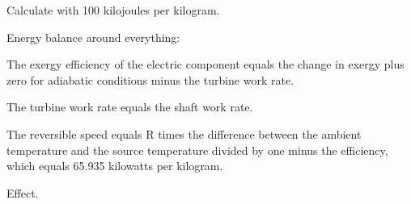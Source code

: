 Calculate with 100 kilojoules per kilogram.

Energy balance around everything:

The exergy efficiency of the electric component equals the change in exergy plus zero for adiabatic conditions minus the turbine work rate.

The turbine work rate equals the shaft work rate.

The reversible speed equals R times the difference between the ambient temperature and the source temperature divided by one minus the efficiency, which equals 65.935 kilowatts per kilogram.

Effect.